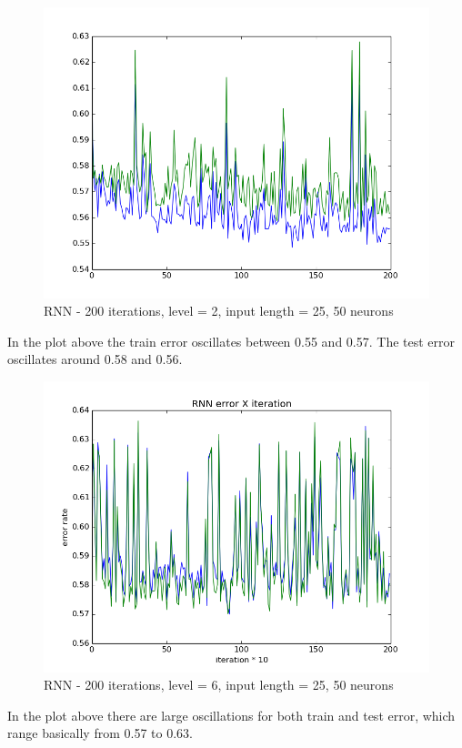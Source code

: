 \documentclass[twoside]{article}
\begin{document}
\begin{multicols}{2}
\begin{figure}[H]
\centering
\includegraphics[scale=0.38]{../results/RNN_200iters_2level_25len_50hidden}
\caption{RNN - 200 iterations, level = 2, input length = 25, 50 neurons}
\label{ref:rnn}
\end{figure}
In the plot above the train error oscillates between 0.55 and 0.57. The test error oscillates around 0.58 and 0.56.
\begin{figure}[H]
\centering
\includegraphics[scale=0.38]{../results/RNN_200iters_6level_25len_50hidden}
\caption{RNN - 200 iterations, level = 6, input length = 25, 50 neurons}
\label{ref:rnn}
\end{figure}
In the plot above there are large oscillations for both train and test error, which range basically from 0.57 to 0.63.

\end{multicols}
\end{document}

